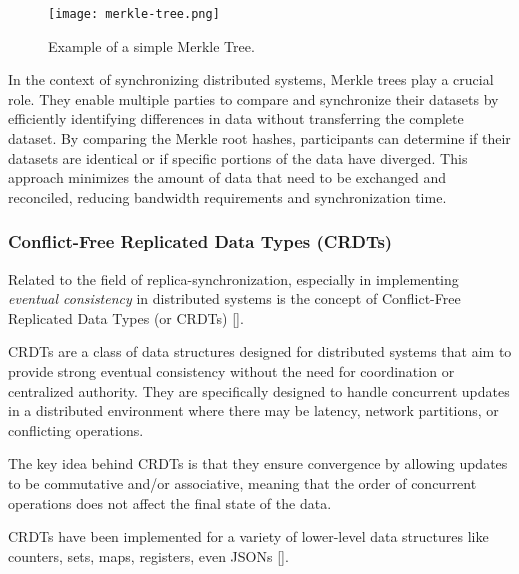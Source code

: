\begin{figure}[h]
    \centering
    \texttt{[image: merkle-tree.png]}
    \caption{Example of a simple Merkle Tree.}
    \label{fig:merkle-tree}
\end{figure}

In the context of synchronizing distributed systems, Merkle trees play a crucial role. They enable multiple parties to compare and synchronize their datasets by efficiently identifying differences in data without transferring the complete dataset. By comparing the Merkle root hashes, participants can determine if their datasets are identical or if specific portions of the data have diverged. This approach minimizes the amount of data that need to be exchanged and reconciled, reducing bandwidth requirements and synchronization time.

\subsubsection{Conflict-Free Replicated Data Types (CRDTs)}

Related to the field of replica-synchronization, especially in implementing \textit{eventual consistency} in distributed systems is the concept of Conflict-Free Replicated Data Types (or CRDTs) [\cite{crdts}].

CRDTs are a class of data structures designed for distributed systems that aim to provide strong eventual consistency without the need for coordination or centralized authority. They are specifically designed to handle concurrent updates in a distributed environment where there may be latency, network partitions, or conflicting operations.

The key idea behind CRDTs is that they ensure convergence by allowing updates to be commutative and/or associative, meaning that the order of concurrent operations does not affect the final state of the data.

CRDTs have been implemented for a variety of lower-level data structures like counters, sets, maps, registers, even JSONs [\cite{json-crdt}].
